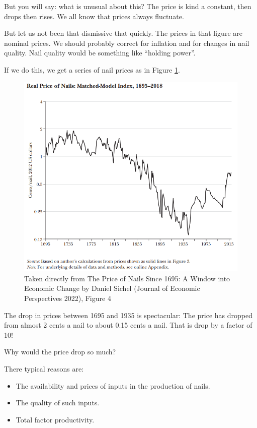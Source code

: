 \documentclass[
]{book}
\providecommand{\tightlist}{%
  \setlength{\itemsep}{0pt}\setlength{\parskip}{0pt}}
\begin{document}
But you will say: what is unusual about this? The price is kind a constant, then drops then rises. We all know that prices always fluctuate.

But let us not been that dismissive that quickly. The prices in that figure are nominal prices. We should probably correct for inflation and for changes in nail quality. Nail quality would be something like ``holding power''.

If we do this, we get a series of nail prices as in Figure \ref{fig:sichelfig4}.

\begin{figure}

{\centering \includegraphics[width=1\linewidth]{img/growth2/sichelfig4} 

}

\caption{Taken directly from The Price of Nails Since 1695: A Window into Economic Change by Daniel Sichel (Journal of Economic Perspectives 2022), Figure 4 }\label{fig:sichelfig4}
\end{figure}

The drop in prices between 1695 and 1935 is spectacular: The price has dropped from almost 2 cents a nail to about 0.15 cents a nail. That is drop by a factor of 10!

Why would the price drop so much?

There typical reasons are:

\begin{itemize}
\tightlist
\item
  The availability and prices of inputs in the production of nails.
\item
  The quality of such inputs.
\item
  Total factor productivity.
\end{itemize}
\end{document}
